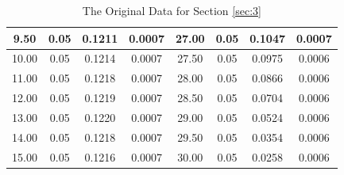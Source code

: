 \documentclass[a4paper]{article}
\begin{document}
\begin{table}[H]
\begin{tabular}{|c|c|c|c||c|c|c|c|}
            9.50&0.05&0.1211&0.0007&27.00&0.05&0.1047&0.0007\\\hline
            10.00&0.05&0.1214&0.0007&27.50&0.05&0.0975&0.0006\\\hline
            11.00&0.05&0.1218&0.0007&28.00&0.05&0.0866&0.0006\\\hline
            12.00&0.05&0.1219&0.0007&28.50&0.05&0.0704&0.0006\\\hline
            13.00&0.05&0.1220&0.0007&29.00&0.05&0.0524&0.0006\\\hline
            14.00&0.05&0.1218&0.0007&29.50&0.05&0.0354&0.0006\\\hline
            15.00&0.05&0.1216&0.0007&30.00&0.05&0.0258&0.0006\\\hline
        \end{tabular}
        \caption{The Original Data for Section \ref{sec:3}}
        \label{tab:origin3}
    \end{table}
\end{document}
